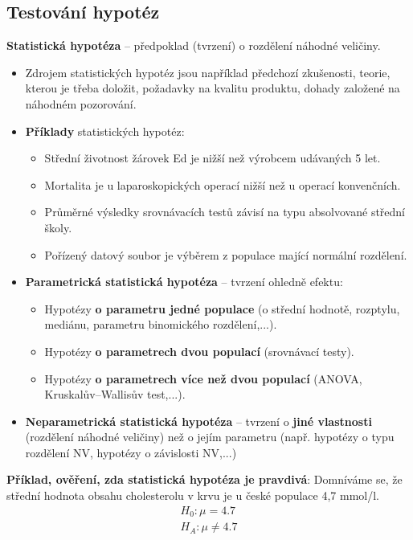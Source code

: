 \subsection{Testování hypotéz}
\textbf{Statistická hypotéza} -- předpoklad (tvrzení) o rozdělení náhodné veličiny.
\begin{itemize}
	\item Zdrojem statistických hypotéz jsou například předchozí zkušenosti, teorie, kterou je třeba doložit, požadavky na kvalitu produktu, dohady založené na náhodném pozorování.
	\item \textbf{Příklady} statistických hypotéz:
	\begin{itemize}
		\item Střední životnost žárovek Ed je nižší než výrobcem udávaných 5 let.
		\item Mortalita je u laparoskopických operací nižší než u operací konvenčních.
		\item Průměrné výsledky srovnávacích testů závisí na typu absolvované střední školy.
		\item Pořízený datový soubor je výběrem z populace mající normální rozdělení.
	\end{itemize}
	\item \textbf{Parametrická statistická hypotéza} -- tvrzení ohledně efektu:
	\begin{itemize}
		\item Hypotézy \textbf{o parametru jedné populace} (o střední hodnotě, rozptylu, mediánu, parametru binomického rozdělení,...).
		\item Hypotézy \textbf{o parametrech dvou populací} (srovnávací testy).
		\item Hypotézy \textbf{o parametrech více než dvou populací} (ANOVA, Kruskalův--Wallisův test,...).
	\end{itemize}
	\item \textbf{Neparametrická statistická hypotéza} -- tvrzení o \textbf{jiné vlastnosti} (rozdělení náhodné veličiny) než o jejím parametru (např. hypotézy o typu rozdělení NV, hypotézy o závislosti NV,...)
\end{itemize}
\textbf{Příklad, ověření, zda statistická hypotéza je pravdivá}: Domníváme se, že střední hodnota obsahu cholesterolu v krvu je u české populace 4,7 mmol/l.
	\begin{equation*}
		\begin{split}
			H_0 : \mu = 4.7	 \\
			H_A : \mu \not = 4.7 
		\end{split}
	\end{equation*}
